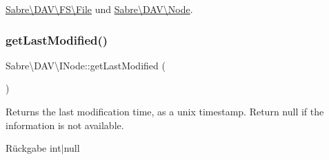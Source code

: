 \mbox{\hyperlink{class_sabre_1_1_d_a_v_1_1_f_s_1_1_file_a87df46fb2d0d38657b31d7ff00c3a519}{Sabre\textbackslash{}\+D\+A\+V\textbackslash{}\+F\+S\textbackslash{}\+File}} und \mbox{\hyperlink{class_sabre_1_1_d_a_v_1_1_node_aab3dca6fc9d878b38b4af9d097bd09d1}{Sabre\textbackslash{}\+D\+A\+V\textbackslash{}\+Node}}.

\mbox{\label{interface_sabre_1_1_d_a_v_1_1_i_node_a06335f81c7d4ec2c6d9e327c8ce61014}} 
\subsubsection{\texorpdfstring{get\+Last\+Modified()}{getLastModified()}}
{\footnotesize\ttfamily Sabre\textbackslash{}\+D\+A\+V\textbackslash{}\+I\+Node\+::get\+Last\+Modified (\begin{DoxyParamCaption}{ }\end{DoxyParamCaption})}

Returns the last modification time, as a unix timestamp. Return null if the information is not available.

\begin{DoxyReturn}{Rückgabe}
int$\vert$null 
\end{DoxyReturn}


